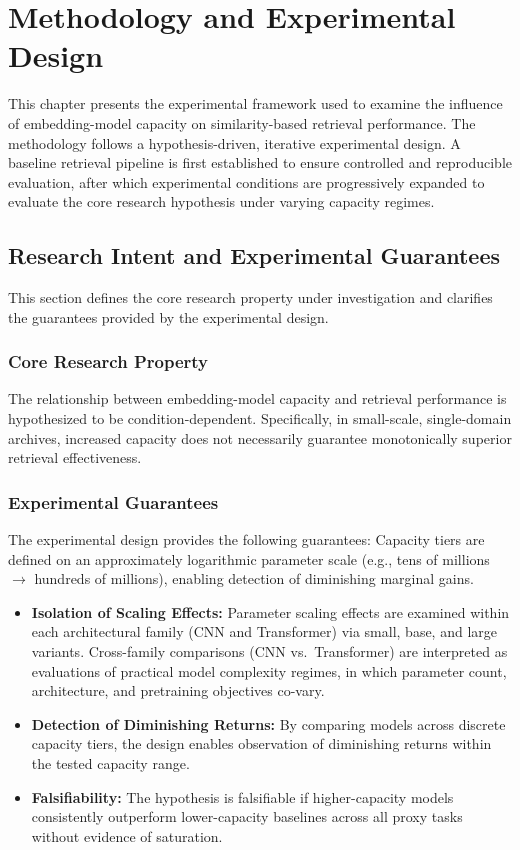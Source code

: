 \chapter{Methodology and Experimental Design}
\label{ch:methodology}

This chapter presents the experimental framework used to examine the influence of embedding-model capacity on similarity-based retrieval performance. 
The methodology follows a hypothesis-driven, iterative experimental design. 
A baseline retrieval pipeline is first established to ensure controlled and reproducible evaluation, after which experimental conditions are progressively expanded to evaluate the core research hypothesis under varying capacity regimes.


\section{Research Intent and Experimental Guarantees}
This section defines the core research property under investigation and clarifies the guarantees provided by the experimental design.

\subsection{Core Research Property}

The relationship between embedding-model capacity and retrieval performance is hypothesized to be condition-dependent. 
Specifically, in small-scale, single-domain archives, increased capacity does not necessarily guarantee monotonically superior retrieval effectiveness.

\subsection{Experimental Guarantees}
The experimental design provides the following guarantees:
Capacity tiers are defined on an approximately logarithmic parameter scale (e.g., tens of millions $\rightarrow$ hundreds of millions), enabling detection of diminishing marginal gains.

\begin{itemize}
    \item \textbf{Isolation of Scaling Effects:} 
    Parameter scaling effects are examined within each architectural family (CNN and Transformer) via small, base, and large variants.
    Cross-family comparisons (CNN vs.\ Transformer) are interpreted as evaluations of practical model complexity regimes, in which parameter count, architecture, and pretraining objectives co-vary.

    \item \textbf{Detection of Diminishing Returns:} 
    By comparing models across discrete capacity tiers, the design enables observation of diminishing returns within the tested capacity range.

    \item \textbf{Falsifiability:} 
    The hypothesis is falsifiable if higher-capacity models consistently outperform lower-capacity baselines across all proxy tasks without evidence of saturation.
\end{itemize}


